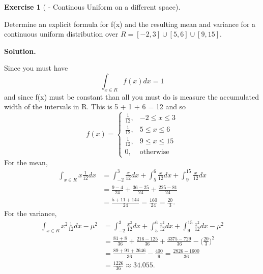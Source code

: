 \documentclass[10pt,]{book}
\theoremstyle{plain}
\theoremstyle{definition}
\theoremstyle{definition}
\theoremstyle{definition}
\newtheorem{exercise}[theorem]{Exercise}
\numberwithin{equation}{section}
\begin{document}
\begin{exercise}[{ - Continous Uniform on a different space}]\label{exercise-51}

Determine an explicit formula for f(x) and the resulting mean and variance for a continuous uniform distribution over \(R = [-2,3] \cup [5,6] \cup [9,15]\).
%
\par\smallskip
\noindent\textbf{Solution.}\hypertarget{solution-10}{}\quad

Since you must have 
\begin{equation*}\int_{x \in R} f(x) dx = 1\end{equation*}
and since f(x) must be constant than all you must do is measure the accumulated width of the intervals in R. This is 5 + 1 + 6 = 12 and so
\begin{equation*}
f(x)=\left\{\begin{matrix}
 \frac{1}{12}, & -2 \le x \le 3
\\ \frac{1}{12}, & 5 \le x \le 6
\\ \frac{1}{12}, & 9 \le x \le 15
\\ 0, & \text{otherwise}
\end{matrix}\right.
\end{equation*}
For the mean, 
	\begin{align*}
\int_{x \in R} x \frac{1}{12} dx & = \int_{-2}^3 \frac{x}{12} dx + \int_5^6 \frac{x}{12} dx + \int_9^{15} \frac{x}{12} dx\\
 & = \frac{9-4}{24} + \frac{36-25}{24} + \frac{225-81}{24}\\
 & = \frac{5+11+144}{24} = \frac{160}{24} = \frac{20}{3}.
\end{align*}
For the variance,
	\begin{align*}
\int_{x \in R} x^2 \frac{1}{12} dx - \mu^2 & = \int_{-2}^3 \frac{x^2}{12} dx + \int_5^6 \frac{x^2}{12} dx + \int_9^{15} \frac{x^2}{12} dx - \mu^2\\
 & = \frac{81+8}{36} + \frac{216-125}{36} + \frac{3375-729}{36} - \big ( \frac{20}{3} \big )^2\\
 & = \frac{89+91+2646}{36} - \frac{400}{9} = \frac{2826-1600}{36} \\
 & = \frac{1226}{36} \approx	34.055.
\end{align*}
%
\end{exercise}
\end{document}

